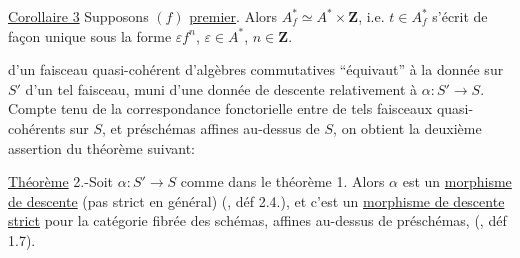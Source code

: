 \uline{Corollaire 3} Supposons $(f)$ \uline{premier}. Alors   $A_f^*\simeq A^*\times\mathbf{Z}$, i.e.  $t\in A_f^*$ s'écrit de façon unique sous la forme $\varepsilon f^n$, $\varepsilon\in A^*$, $n\in\mathbf{Z}$.

d'un faisceau quasi-cohérent d'algèbres commutatives ``équivaut'' à la donnée sur $S'$ d'un tel faisceau, muni d'une donnée de descente relativement à $\alpha:S'\longrightarrow S$.   Compte tenu de la correspondance fonctorielle entre de tels faisceaux quasi-cohérents sur $S$, et  préschémas  affines au-dessus de $S$, on obtient la deuxième assertion du théorème suivant:

\uline{Théorème} 2.-Soit $\alpha:S'\longrightarrow S$  comme dans le théorème 1. Alors $\alpha$ est un \uline{morphisme de descente} (pas strict en général) (, déf 2.4.), et c'est un \uline{morphisme de descente strict} pour la catégorie fibrée des schémas, affines au-dessus de préschémas, (, déf 1.7).

